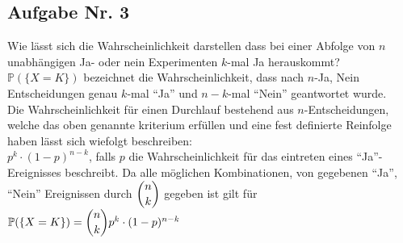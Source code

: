\documentclass{newlayout}
\begin{document}
\subsection{Aufgabe Nr. 3}
Wie lässt sich die Wahrscheinlichkeit darstellen dass bei einer Abfolge von $n$ unabhängigen Ja- oder nein Experimenten $k$-mal Ja herauskommt?\\
$\mathbb{P}(\{X=K\})$ bezeichnet die Wahrscheinlichkeit, dass nach $n$-Ja, Nein Entscheidungen genau $k$-mal "`Ja"' und $n-k$-mal "`Nein"' geantwortet wurde.\\
Die Wahrscheinlichkeit für einen Durchlauf bestehend aus $n$-Entscheidungen, welche das oben genannte kriterium erfüllen und eine fest definierte Reinfolge haben lässt sich wiefolgt beschreiben:\\
$p^k\cdot (1-p)^{n-k}$, falls $p$ die Wahrscheinlichkeit für das eintreten eines "`Ja"'- Ereignisses beschreibt. Da alle möglichen Kombinationen, von gegebenen "`Ja"', "`Nein"' Ereignissen durch $\dbinom{n}{k}$ gegeben ist gilt für $\mathbb{P}(\{X=K\})=\dbinom{n}{k}p^k\cdot (1-p)^{n-k}$
\end{document}
